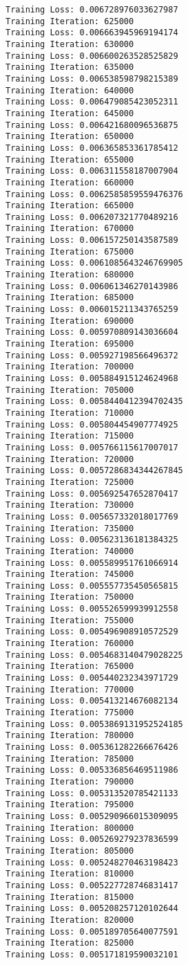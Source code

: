 \documentclass[11pt]{article}
\begin{document}
\begin{Verbatim}[commandchars=\\\{\}]
Training Loss: 0.006728976033627987
Training Iteration: 625000
Training Loss: 0.006663945969194174
Training Iteration: 630000
Training Loss: 0.006600263528525829
Training Iteration: 635000
Training Loss: 0.006538598798215389
Training Iteration: 640000
Training Loss: 0.006479085423052311
Training Iteration: 645000
Training Loss: 0.006421680096536875
Training Iteration: 650000
Training Loss: 0.006365853361785412
Training Iteration: 655000
Training Loss: 0.006311558187007904
Training Iteration: 660000
Training Loss: 0.0062585859559476376
Training Iteration: 665000
Training Loss: 0.006207321770489216
Training Iteration: 670000
Training Loss: 0.006157250143587589
Training Iteration: 675000
Training Loss: 0.0061085643246769905
Training Iteration: 680000
Training Loss: 0.006061346270143986
Training Iteration: 685000
Training Loss: 0.006015211343765259
Training Iteration: 690000
Training Loss: 0.005970809143036604
Training Iteration: 695000
Training Loss: 0.005927198566496372
Training Iteration: 700000
Training Loss: 0.005884915124624968
Training Iteration: 705000
Training Loss: 0.0058440412394702435
Training Iteration: 710000
Training Loss: 0.005804454907774925
Training Iteration: 715000
Training Loss: 0.005766115617007017
Training Iteration: 720000
Training Loss: 0.0057286834344267845
Training Iteration: 725000
Training Loss: 0.005692547652870417
Training Iteration: 730000
Training Loss: 0.005657332018017769
Training Iteration: 735000
Training Loss: 0.005623136181384325
Training Iteration: 740000
Training Loss: 0.005589951761066914
Training Iteration: 745000
Training Loss: 0.005557735450565815
Training Iteration: 750000
Training Loss: 0.005526599939912558
Training Iteration: 755000
Training Loss: 0.005496908910572529
Training Iteration: 760000
Training Loss: 0.0054683140479028225
Training Iteration: 765000
Training Loss: 0.005440232343971729
Training Iteration: 770000
Training Loss: 0.005413214676082134
Training Iteration: 775000
Training Loss: 0.0053869131952524185
Training Iteration: 780000
Training Loss: 0.005361282266676426
Training Iteration: 785000
Training Loss: 0.005336856469511986
Training Iteration: 790000
Training Loss: 0.005313520785421133
Training Iteration: 795000
Training Loss: 0.005290966015309095
Training Iteration: 800000
Training Loss: 0.005269279237836599
Training Iteration: 805000
Training Loss: 0.005248270463198423
Training Iteration: 810000
Training Loss: 0.005227728746831417
Training Iteration: 815000
Training Loss: 0.005208257120102644
Training Iteration: 820000
Training Loss: 0.005189705640077591
Training Iteration: 825000
Training Loss: 0.005171819590032101

\end{Verbatim}
\end{document}
